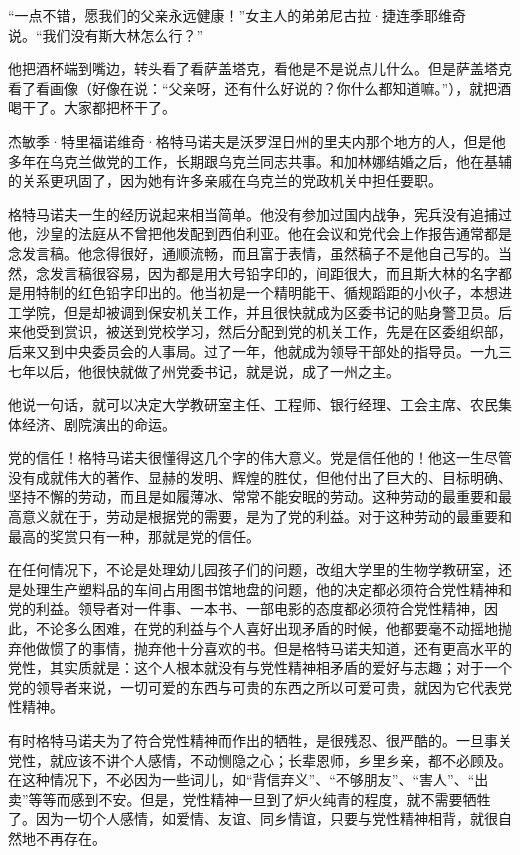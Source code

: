 “一点不错，愿我们的父亲永远健康！”女主人的弟弟尼古拉·捷连季耶维奇说。“我们没有斯大林怎么行？”

他把酒杯端到嘴边，转头看了看萨盖塔克，看他是不是说点儿什么。但是萨盖塔克看了看画像（好像在说：“父亲呀，还有什么好说的？你什么都知道嘛。”），就把酒喝干了。大家都把杯干了。

杰敏季·特里福诺维奇·格特马诺夫是沃罗涅日州的里夫内那个地方的人，但是他多年在乌克兰做党的工作，长期跟乌克兰同志共事。和加林娜结婚之后，他在基辅的关系更巩固了，因为她有许多亲戚在乌克兰的党政机关中担任要职。

格特马诺夫一生的经历说起来相当简单。他没有参加过国内战争，宪兵没有追捕过他，沙皇的法庭从不曾把他发配到西伯利亚。他在会议和党代会上作报告通常都是念发言稿。他念得很好，通顺流畅，而且富于表情，虽然稿子不是他自己写的。当然，念发言稿很容易，因为都是用大号铅字印的，间距很大，而且斯大林的名字都是用特制的红色铅字印出的。他当初是一个精明能干、循规蹈距的小伙子，本想进工学院，但是却被调到保安机关工作，并且很快就成为区委书记的贴身警卫员。后来他受到赏识，被送到党校学习，然后分配到党的机关工作，先是在区委组织部，后来又到中央委员会的人事局。过了一年，他就成为领导干部处的指导员。一九三七年以后，他很快就做了州党委书记，就是说，成了一州之主。

他说一句话，就可以决定大学教研室主任、工程师、银行经理、工会主席、农民集体经济、剧院演出的命运。

党的信任！格特马诺夫很懂得这几个字的伟大意义。党是信任他的！他这一生尽管没有成就伟大的著作、显赫的发明、辉煌的胜仗，但他付出了巨大的、目标明确、坚持不懈的劳动，而且是如履薄冰、常常不能安眠的劳动。这种劳动的最重要和最高意义就在于，劳动是根据党的需要，是为了党的利益。对于这种劳动的最重要和最高的奖赏只有一种，那就是党的信任。

在任何情况下，不论是处理幼儿园孩子们的问题，改组大学里的生物学教研室，还是处理生产塑料品的车间占用图书馆地盘的问题，他的决定都必须符合党性精神和党的利益。领导者对一件事、一本书、一部电影的态度都必须符合党性精神，因此，不论多么困难，在党的利益与个人喜好出现矛盾的时候，他都要毫不动摇地抛弃他做惯了的事情，抛弃他十分喜欢的书。但是格特马诺夫知道，还有更高水平的党性，其实质就是：这个人根本就没有与党性精神相矛盾的爱好与志趣；对于一个党的领导者来说，一切可爱的东西与可贵的东西之所以可爱可贵，就因为它代表党性精神。

有时格特马诺夫为了符合党性精神而作出的牺牲，是很残忍、很严酷的。一旦事关党性，就应该不讲个人感情，不动恻隐之心；长辈恩师，乡里乡亲，都不必顾及。在这种情况下，不必因为一些词儿，如“背信弃义”、“不够朋友”、“害人”、“出卖”等等而感到不安。但是，党性精神一旦到了炉火纯青的程度，就不需要牺牲了。因为一切个人感情，如爱情、友谊、同乡情谊，只要与党性精神相背，就很自然地不再存在。

